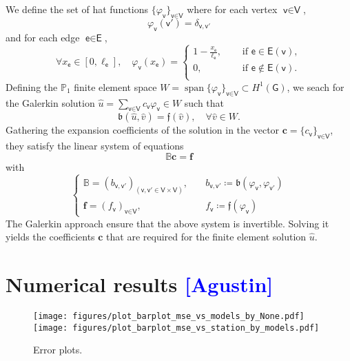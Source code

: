 \documentclass[11pt,a4paper,twoside]{article}
\theoremstyle{definition}
\numberwithin{equation}{section}
\newcommand{\bB}{\ensuremath{\mathbb{B}}}
\newcommand{\bP}{\ensuremath{\mathbb{P}}}
\newcommand{\G}{\ensuremath{\textsf{G}}} %
\newcommand{\E}{\ensuremath{\textsf{E}}} %
\newcommand{\V}{\ensuremath{\textsf{V}}} %
\newcommand{\vv}{\ensuremath{\textsf{v}}}
\newcommand{\ee}{\ensuremath{\textsf{e}}}
\newcommand{\<}{\langle}
\renewcommand{\>}{\rangle}
\newcommand{\vspan}{\operatorname{span}}
\newcommand{\om}[1]{\textcolor{blue}{#1}}
\begin{document}
We define the set of hat functions $\{\varphi_\vv\}_{\vv\in \V}$ where for each vertex $\vv\in \V$,
$$
\varphi_\vv( \vv') = \delta_{\vv, \vv'}
$$
and for each edge $\ee \in \E$,
\begin{equation}
\forall x_\ee \in [0, \ell_\ee],\quad
\varphi_\vv(x_\ee)=
\begin{cases}
1-\frac{x_\ee}{\ell_\ee}, \quad &\text{ if } \ee \in \E(\vv), \\
0 , \quad &\text{ if } \ee \not\in \E(\vv). \\
\end{cases}
\end{equation}
Defining the $\bP_1$ finite element space $W = \vspan\{\varphi_\vv\}_{\vv\in \V} \subset H^1(\G)$, we seach for the Galerkin solution $\hat u = \sum_{\vv\in \V} c_\vv \varphi_\vv \in W$ such that
$$
\mathfrak{b}(\hat u, \hat v) = \mathfrak{f} (\hat v), \quad \forall \hat v\in W.
$$
Gathering the expansion coefficients of the solution in the vector $\textbf{c} = \{c_\vv\}_{\vv\in \V}$, they satisfy the linear system of equations
$$
\bB\textbf{c} = \textbf{f}
$$
with
\begin{equation}
\begin{cases}
\bB = (b_{\vv, \vv'})_{(\vv,\vv'\in \V \times \V)}, \quad &b_{\vv, \vv'} \coloneqq \mathfrak{b}(\varphi_\vv, \varphi_{\vv'}) \\
\textbf{f} = (f_\vv)_{\vv\in \V}, \quad &f_\vv \coloneqq \mathfrak{f}(\varphi_\vv)
\end{cases}
\end{equation}
The Galerkin approach ensure that the above system is invertible. Solving it yields the coefficients $\textbf{c}$ that are required for the finite element solution $\hat u$.








\section{Numerical results \om{[Agustin]}}
\label{sec:numerical-tests}


\begin{figure}
    \centering
    \texttt{[image: figures/plot\_barplot\_mse\_vs\_models\_by\_None.pdf]}
    \texttt{[image: figures/plot\_barplot\_mse\_vs\_station\_by\_models.pdf]}
    \caption{Error plots.}
    \label{fig:errorplots}
\end{figure}
\end{document}

